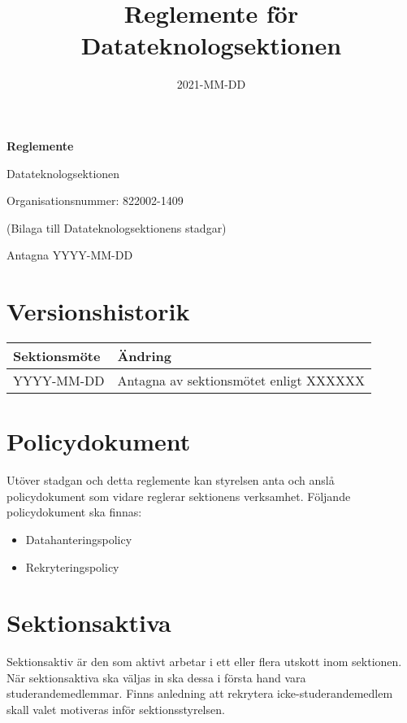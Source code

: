 \documentclass{datateknologsektionen-document}
\title{Reglemente för Datateknologsektionen}
\date{2021-MM-DD}
\begin{document}
\hspace{0pt}
\vfill

\begin{center}
  \Huge\textbf{Reglemente}

  \huge Datateknologsektionen

  \large
  Organisationsnummer: 822002-1409

  \vspace{4mm}
  (Bilaga till Datateknologsektionens stadgar)

  \vspace{4mm}

  Antagna YYYY-MM-DD

\end{center}
\vfill
\hspace{0pt}
\pagebreak

\section*{Versionshistorik}
\begin{footnotesize}
  \begin{longtabu} to \linewidth { |l|X| }
    \hline
    \textbf{Sektionsmöte} & \textbf{Ändring}  \\ \hline
    YYYY-MM-DD & Antagna av sektionsmötet enligt XXXXXX \\ \hline
  \end{longtabu}
\end{footnotesize}

\pagebreak
\tableofcontents

\pagebreak

\section{Policydokument}
Utöver stadgan och detta reglemente kan styrelsen anta och anslå policydokument som
vidare reglerar sektionens verksamhet. Följande policydokument ska finnas:
\begin{itemize}
  \item Datahanteringspolicy
  \item Rekryteringspolicy
\end{itemize}

\section{Sektionsaktiva}
Sektionsaktiv är den som aktivt arbetar i ett eller flera utskott inom sektionen.
När sektionsaktiva ska väljas in ska dessa i första hand vara studerandemedlemmar.
Finns anledning att rekrytera icke-studerandemedlem skall valet motiveras inför
sektionsstyrelsen.
\end{document}
